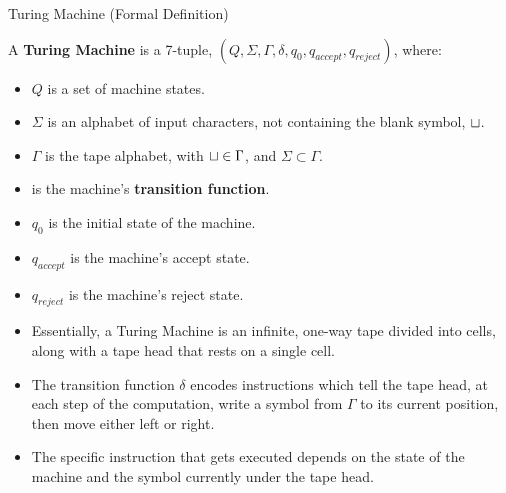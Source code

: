 \documentclass[c]{beamer}
\begin{document}
\begin{frame}{Turing Machine (Formal Definition)}

  \begin{definition}

    A \textbf{Turing Machine} is a 7-tuple, $(Q, \Sigma, \Gamma,
    \delta, q_0, q_{accept}, q_{reject})$, where:

    \begin{itemize}
    \item $Q$ is a set of machine states.
    \item $\Sigma$ is an alphabet of input characters, not containing
      the blank symbol, $\sqcup$.
    \item $\Gamma$ is the tape alphabet, with $\sqcup \in \Gamma$, and
      $\Sigma \subset \Gamma$.
    \item {} is the machine's
      \textbf{transition function}.
    \item $q_0$ is the initial state of the machine.
    \item $q_{accept}$ is the machine's accept state.
    \item $q_{reject}$ is the machine's reject state.
    \end{itemize}
  \end{definition}
  
\end{frame}

\begin{frame}
  
  \begin{itemize}
  \item Essentially, a Turing Machine is an infinite, one-way tape
    divided into cells, along with a tape head that rests on a
    single cell.  
  \item The transition function $\delta$ encodes instructions
    which tell the tape head, at each step of the computation,
    write a symbol from $\Gamma$ to its current position, then
    move either left or right.
  \item The specific instruction that gets executed depends on the
    state of the machine and the symbol currently under the tape
    head.
  \end{itemize}
\end{frame}
\end{document}
